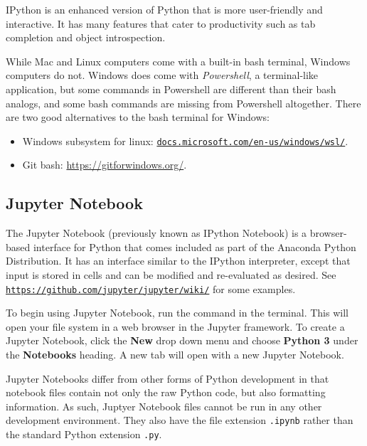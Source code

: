 IPython is an enhanced version of Python that is more user-friendly and interactive.
It has many features that cater to productivity such as tab completion and object introspection.

\begin{info}
While Mac and Linux computers come with a built-in bash terminal, Windows computers do not.
Windows does come with \emph{Powershell}, a terminal-like application, but some commands in Powershell are different than their bash analogs, and some bash commands are missing from Powershell altogether.
There are two good alternatives to the bash terminal for Windows:
\begin{itemize}
\item Windows subsystem for linux: \href{https://docs.microsoft.com/en-us/windows/wsl/install-win10}{\texttt{docs.microsoft.com/en-us/windows/wsl/}}.
\item Git bash: \url{https://gitforwindows.org/}.
\end{itemize}
\end{info}

\subsection*{Jupyter Notebook} %

The Jupyter Notebook (previously known as IPython Notebook) is a browser-based interface for Python that comes included as part of the Anaconda Python Distribution.
It has an interface similar to the IPython interpreter, except that input is stored in cells and can be modified and re-evaluated as desired.
See \href{https://github.com/jupyter/jupyter/wiki/A-gallery-of-interesting-Jupyter-Notebooks}{\texttt{https://github.com/jupyter/jupyter/wiki/}} for some examples.

To begin using Jupyter Notebook, run the command  in the terminal.
This will open your file system in a web browser in the Jupyter framework.
To create a Jupyter Notebook, click the \textbf{New} drop down menu and choose \textbf{Python 3} under the \textbf{Notebooks} heading.
A new tab will open with a new Jupyter Notebook.

Jupyter Notebooks differ from other forms of Python development in that notebook files contain not only the raw Python code, but also formatting information.
As such, Juptyer Notebook files cannot be run in any other development environment.
They also have the file extension \texttt{.ipynb} rather than the standard Python extension \texttt{.py}.


